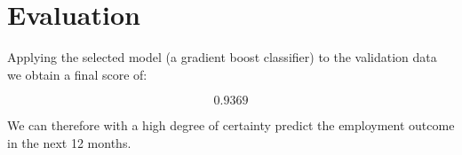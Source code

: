 \section{Evaluation}
\label{sec:evaluation}


Applying the selected model (a gradient boost classifier) to the validation
data we obtain a final score of:

    \[0.9369\]

We can therefore with a high degree of certainty predict the employment
outcome in the next 12 months.
